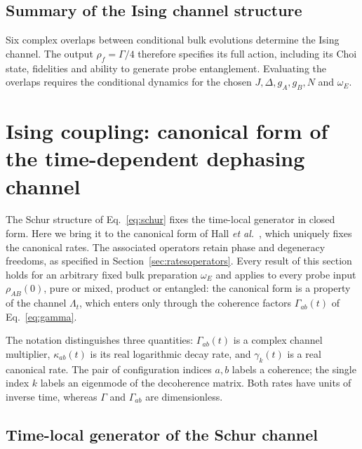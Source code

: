 \documentclass[11pt,a4paper]{article}
\begin{document}
\subsection{Summary of the Ising channel structure}

Six complex overlaps between conditional bulk evolutions determine the
Ising channel. The output $\rho_f=\Gamma/4$ therefore specifies its full
action, including its Choi state, fidelities and ability to generate
probe entanglement. Evaluating the overlaps requires the conditional
dynamics for the chosen $J,\Delta,g_A,g_B,N$ and $\omega_E$.

\section{Ising coupling: canonical form of the time-dependent dephasing channel}
\label{sec:canonical}

The Schur structure of Eq.~\eqref{eq:schur} fixes the time-local
generator in closed form. Here we bring it to the canonical form of
Hall \emph{et al.}~\cite{Hall2014}, which uniquely fixes the canonical
rates. The associated operators retain phase and degeneracy freedoms,
as specified in Section~\ref{sec:ratesoperators}. Every result of this
section holds for an arbitrary fixed bulk preparation $\omega_E$ and
applies to every probe input $\rho_{AB}(0)$, pure or mixed, product or
entangled: the canonical form is a property of the channel $\Lambda_t$,
which enters only through the coherence factors $\Gamma_{ab}(t)$ of
Eq.~\eqref{eq:gamma}.

The notation distinguishes three quantities: $\Gamma_{ab}(t)$ is a
complex channel multiplier, $\kappa_{ab}(t)$ is its real logarithmic
decay rate, and $\gamma_k(t)$ is a real canonical rate. The pair of
configuration indices $a,b$ labels a coherence; the single index $k$
labels an eigenmode of the decoherence matrix. Both rates have units
of inverse time, whereas $\Gamma$ and $\Gamma_{ab}$ are dimensionless.

\subsection{Time-local generator of the Schur channel}
\label{sec:schurgenerator}
\end{document}
